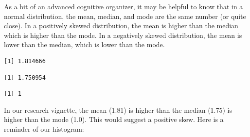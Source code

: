 \documentclass[
  11pt,
]{book}
\newenvironment{Shaded}{\begin{snugshade}}{\end{snugshade}}
\newcommand{\AttributeTok}[1]{\textcolor[rgb]{0.77,0.63,0.00}{#1}}
\newcommand{\ConstantTok}[1]{\textcolor[rgb]{0.00,0.00,0.00}{#1}}
\newcommand{\FunctionTok}[1]{\textcolor[rgb]{0.00,0.00,0.00}{#1}}
\newcommand{\NormalTok}[1]{#1}
\newcommand{\SpecialCharTok}[1]{\textcolor[rgb]{0.00,0.00,0.00}{#1}}
\newcommand{\StringTok}[1]{\textcolor[rgb]{0.31,0.60,0.02}{#1}}
\begin{document}
As a bit of an advanced cognitive organizer, it may be helpful to know that in a normal distribution, the mean, median, and mode are the same number (or quite close). In a positively skewed distribution, the mean is higher than the median which is higher than the mode. In a negatively skewed distribution, the mean is lower than the median, which is lower than the mode.

\begin{Shaded}
\end{Shaded}

\begin{verbatim}
[1] 1.814666
\end{verbatim}

\begin{Shaded}
\end{Shaded}

\begin{verbatim}
[1] 1.750954
\end{verbatim}

\begin{Shaded}
\end{Shaded}

\begin{verbatim}
[1] 1
\end{verbatim}

In our research vignette, the mean (1.81) is higher than the median (1.75) is higher than the mode (1.0). This would suggest a positive skew. Here is a reminder of our histogram:

\begin{Shaded}
\end{Shaded}
\end{document}
